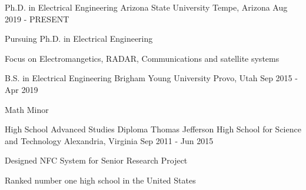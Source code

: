 

\begin{cventries}

    \cventry
    {Ph.D. in Electrical Engineering} %
    {Arizona State University} %
    {Tempe, Arizona} %
    {Aug 2019 - PRESENT} %
    {
        \begin{cvitems} %
        \item {Pursuing Ph.D. in Electrical Engineering}
        \item {Focus on Electromangetics, RADAR, Communications and satellite systems}
        \end{cvitems}
    }

    \cventry
    {B.S. in Electrical Engineering} %
    {Brigham Young University} %
    {Provo, Utah} %
    {Sep 2015 - Apr 2019} %
    {
        \begin{cvitems} %
        \item {Math Minor}
        \end{cvitems}
    }

    \cventry
    {High School Advanced Studies Diploma} %
    {Thomas Jefferson High School for Science and Technology} %
    {Alexandria, Virginia} %
    {Sep 2011 - Jun 2015} %
    {
        \begin{cvitems} %
        \item {Designed NFC System for Senior Research Project}
        \item {Ranked number one high school in the United States} 
        \end{cvitems}
    }

\end{cventries}
